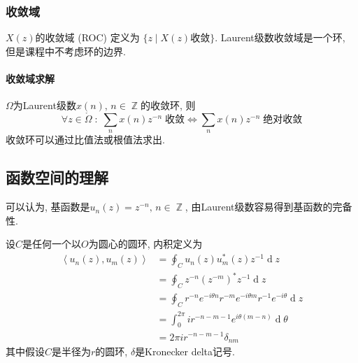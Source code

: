 \documentclass{ctexart}
\DeclareMathOperator{\ud}{\mathrm{d}}
\DeclareMathOperator{\Zset}{\mathbb{Z}}
\begin{document}
\subsubsection{收敛域} $X(z)$的收敛域 (ROC) 定义为 $\{z \;|\; X(z)\text{收敛}\}$.
    Laurent级数收敛域是一个环, 但是课程中不考虑环的边界.
\paragraph{收敛域求解} $\Omega$为Laurent级数$x(n),\,n\in\Zset$的收敛环, 则
    \[\forall z \in \mathring{\Omega}\;:\;
        \sum_n x(n)z^{-n}\;\text{收敛} \Leftrightarrow
        \sum_n x(n)z^{-n}\;\text{绝对收敛} \]
    收敛环可以通过比值法或根值法求出.
\subsection{函数空间的理解}
    可以认为, 基函数是$u_n(z) = z^{-n},\,n \in \Zset$, 由Laurent级数容易得到基函数的完备性.\par
    设$C$是任何一个以$O$为圆心的圆环, 内积定义为\begin{align*}
        \left\langle u_n(z), u_m(z) \right\rangle &= \oint_C u_n(z) u_m^*(z) z^{-1} \ud z\\
            &= \oint_C z^{-n} (z^{-m})^* z^{-1} \ud z\\
            &= \oint_C r^{-n} e^{-i \theta n} r^{-m} e^{-i \theta m} r^{-1} e^{-i \theta} \ud z\\
            &= \int_0^{2\pi} i r^{-n-m-1} e^{i \theta (m - n)} \ud \theta\\
        &= 2 \pi i r^{-n-m-1} \delta_{nm}\end{align*}
    其中假设$C$是半径为$r$的圆环, $\delta$是Kronecker delta记号.
\end{document}
